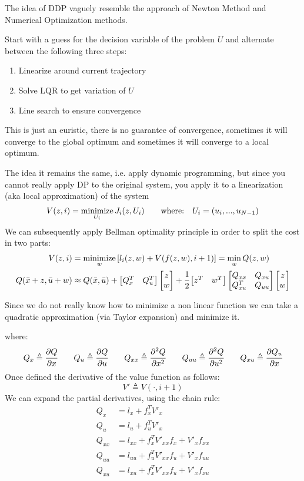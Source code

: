The idea of DDP vaguely resemble the approach of Newton Method and Numerical Optimization methods.

Start with a guess for the decision variable of the problem $U$ and alternate between the following three steps:
\begin{enumerate}
\item Linearize around current trajectory
\item Solve LQR to get variation of $U$
\item Line search to ensure convergence
\end{enumerate}
This is just an euristic, there is no guarantee of convergence, sometimes it will converge to the global optimum and sometimes it will converge to a local optimum.

The idea it remains the same, i.e. apply dynamic programming, but since you cannot really apply DP to the original system, you apply it to a linearization (aka local approximation) of the system
\begin{gather*}
V(z,i) =\operatorname*{minimize}_{U_i} J_i(z, U_i)\qquad \text{where:}\quad U_i = (u_i, ... , u_{N-1})
\end{gather*}
We can subsequently apply Bellman optimality principle in order to split the cost in two parts:
\begin{align*}
V(z,i) &= \operatorname*{minimize}_w\left[l_i(z,w) + V(f(z,w), i+1)\right] = \min_w Q(z,w)\\
Q(\bar{x} + z, \bar{u}+w)&\approx Q(\bar{x}, \bar{u}) + \begin{bmatrix}Q_x^T&Q_u^T\end{bmatrix}\begin{bmatrix}z\\w\end{bmatrix} + \cfrac{1}{2}\begin{bmatrix}z^T&w^T\end{bmatrix}\begin{bmatrix}Q_{xx}&Q_{xu}\\Q_{xu}^T&Q_{uu}\end{bmatrix}\begin{bmatrix}z\\w\end{bmatrix}
\end{align*}

Since we do not really know how to minimize a non linear function we can take a quadratic approximation (via Taylor expansion) and minimize it.

where:
\begin{gather*}
Q_x\triangleq \cfrac{\partial Q}{\partial x}\qquad Q_u\triangleq\cfrac{\partial Q}{\partial u}\qquad Q_{xx}\triangleq\cfrac{\partial^2Q}{\partial x^2}\qquad Q_{uu}\triangleq\cfrac{\partial^2Q}{\partial u^2}\qquad Q_{xu}\triangleq \cfrac{\partial Q_u}{\partial x}
\end{gather*}
Once defined the derivative of the value function as follows:
\[V' \triangleq V(\cdot, i+1)\]
We can expand the partial derivatives, using the chain rule:
\begin{align*}
Q_x &= l_x + f_x^T V'_x\\
Q_u &= l_u + f_u^T V'_x\\
Q_{xx} &= l_{xx} + f_x^T V'_{xx}f_x + V'_x f_{xx}\\
Q_{uu} &= l_{uu} + f_u^T V'_{xx}f_u + V'_x f_{uu}\\
Q_{xu} &= l_{xu} + f_x^T V'_{xx}f_u + V'_x f_{xu}
\end{align*}

